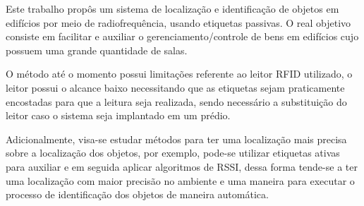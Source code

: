 
\label{chapter:consideracoes}

Este trabalho propôs um sistema de localização e identificação de objetos em edifícios por meio de
radiofrequência, usando etiquetas passivas. O real objetivo consiste em facilitar e auxiliar o gerenciamento/controle de
bens em edifícios cujo possuem uma grande quantidade de salas.
\par
O método até o momento possui limitações referente ao leitor RFID utilizado, o leitor possui o alcance baixo necessitando que as etiquetas sejam praticamente encostadas para que a leitura seja realizada, sendo necessário a substituição do leitor caso o sistema seja implantado em um prédio.
\par

Adicionalmente, visa-se estudar métodos para ter uma localização mais precisa sobre a localização dos objetos, por exemplo, pode-se utilizar etiquetas ativas para auxiliar e em seguida aplicar algoritmos de RSSI, dessa forma tende-se a ter uma localização com maior precisão no ambiente e uma maneira para executar o processo de identificação dos objetos de maneira automática.




